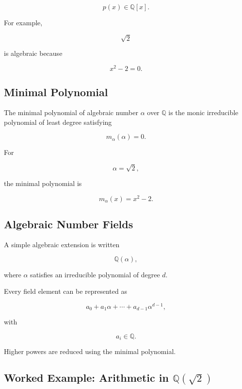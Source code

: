\[
\boxed{
p(x)\in\mathbb{Q}[x].
}
\]

For example,

\[
\sqrt{2}
\]

is algebraic because

\[
\boxed{
x^2-2=0.
}
\]

\subsection{Minimal Polynomial}
\label{subsec:minimal-polynomial-computer-algebra}

The minimal polynomial of algebraic number \(\alpha\) over \(\mathbb{Q}\)
is the monic irreducible polynomial of least degree satisfying

\[
\boxed{
m_\alpha(\alpha)=0.
}
\]

For

\[
\alpha=\sqrt{2},
\]

the minimal polynomial is

\[
\boxed{
m_\alpha(x)=x^2-2.
}
\]

\subsection{Algebraic Number Fields}
\label{subsec:algebraic-number-fields-computation}

A simple algebraic extension is written

\[
\boxed{
\mathbb{Q}(\alpha),
}
\]

where \(\alpha\) satisfies an irreducible polynomial of degree \(d\).

Every field element can be represented as

\[
\boxed{
a_0
+
a_1\alpha
+
\cdots
+
a_{d-1}\alpha^{d-1},
}
\]

with

\[
a_i\in\mathbb{Q}.
\]

Higher powers are reduced using the minimal polynomial.

\subsection{Worked Example: Arithmetic in \(\mathbb{Q}(\sqrt{2})\)}
\label{subsec:worked-algebraic-number-arithmetic}

